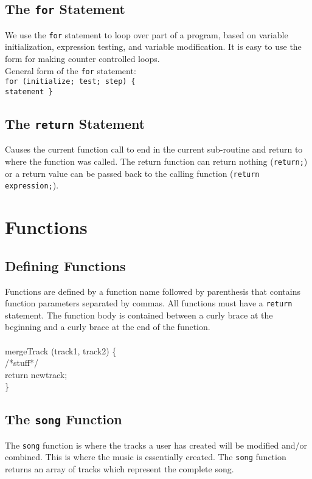 \documentclass[letterpaper]{article}
\begin{document}
\subsection{The \texttt{for} Statement}
We use the \texttt{for} statement to loop over part of a program, based on variable initialization, expression testing, and variable modification. It is easy to use the form for making counter controlled loops. \\
General form of the \texttt{for} statement: \\
\texttt{for (initialize; test; step) \{ \\
statement \} }
\subsection{The \texttt{return} Statement}
Causes the current function call to end in the current sub-routine and return to where the function was called. The return function can return nothing (\texttt{return;}) or a return value can be passed back to the calling function (\texttt{return expression;}).
\section{Functions}
\subsection{Defining Functions}
Functions are defined by a function name followed by parenthesis that contains function parameters separated by commas. All functions must have a \texttt{return} statement. The function body is contained between a curly brace at the beginning and a curly brace at the end of the function. \\\\ mergeTrack (track1, track2) \{ \\
		/*stuff*/ \\
	return newtrack;\\
\}


\subsection{The \texttt{song} Function}
The \texttt{song} function is where the tracks a user has created will be modified and/or combined. This is where the music is essentially created. The \texttt{song} function returns an array of tracks which represent the complete song.
\end{document}
